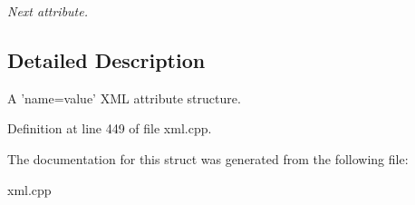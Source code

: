 \begin{DoxyCompactItemize}
\begin{DoxyCompactList}\small\item\em Next attribute. \item\end{DoxyCompactList}\end{DoxyCompactItemize}


\subsection{Detailed Description}
A 'name=value' XML attribute structure. 

Definition at line 449 of file xml.cpp.



The documentation for this struct was generated from the following file:\begin{DoxyCompactItemize}
\item 
xml.cpp\end{DoxyCompactItemize}
